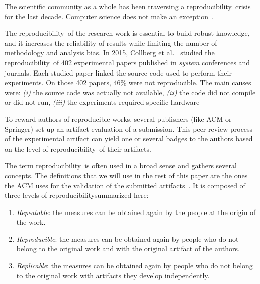 \documentclass[sigconf,natbib=false]{acmart}
\newcommand{\repro}{reproducibility}
\begin{document}
The scientific community as a whole has been traversing a \repro\ crisis for the last decade.
Computer science does not make an exception\ \cite{randallIrreproducibilityCrisisModern2018,baker500ScientistsLift2016}.

The \repro\ of the research work is essential to build robust knowledge, and it increases the reliability of results while limiting the number of methodology and analysis bias.
In 2015, Collberg et al.\ \cite{collberg_repeatability_2015} studied the \repro\ of 402 experimental papers published in \emph{system} conferences and journals.
Each studied paper linked the source code used to perform their experiments. 
On those 402 papers, 46\% were not reproducible.
The main causes were:
\emph{(i)} the source code was actually not available,
\emph{(ii)} the code did not compile or did not run,
\emph{(iii)} the experiments required specific hardware

To reward authors of reproducible works, several publishers (like ACM or Springer) set up an artifact evaluation of a submission.
This peer review process of the experimental artifact can yield one or several badges to the authors based on the level of \repro\ of their artifacts.

The term \repro\ is often used in a broad sense and gathers several concepts.
The definitions that we will use in the rest of this paper are the ones the ACM uses for the validation of the submitted artifacts\ \cite{acm-badges}.
It is composed of three levels of \repro summarized here:

\begin{enumerate}
\item \emph{Repeatable}: the measures can be obtained again by the people at the origin of the work.
\item \emph{Reproducible}: the measures can be obtained again by people who do not belong to the original work and with the original artifact of the authors.
\item \emph{Replicable}: the measures can be obtained again by people who do not belong to the original work with   artifacts they develop independently.
\end{enumerate}

\end{document}
